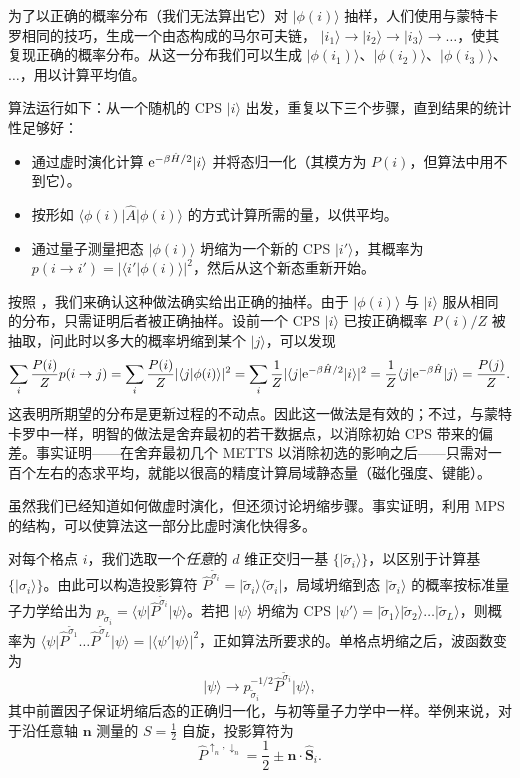 \documentclass[a4paper,10pt,oneside,onecolumn,1p,times]{elsarticle}
\newcommand{\eul}{{\rm e }}
\newcommand{\bra}[1]{\mbox{$\langle #1  |$}}
\newcommand{\ket}[1]{\mbox{$| #1  \rangle$}}
\newcommand{\braket}[2]{\mbox{$\langle #1  | #2 \rangle$}} 	%
\begin{document}
为了以正确的概率分布（我们无法算出它）对 $\ket{\phi(i)}$ 抽样，人们使用与蒙特卡罗相同的技巧，生成一个由态构成的马尔可夫链，
$\ket{i_1} \rightarrow \ket{i_2} \rightarrow \ket{i_3} \rightarrow \ldots$，使其复现正确的概率分布。从这一分布我们可以生成 $\ket{\phi(i_1)}$、$\ket{\phi(i_2)}$、$\ket{\phi(i_3)}$、$\ldots$，用以计算平均值。

算法运行如下：从一个随机的 CPS $\ket{i}$ 出发，重复以下三个步骤，直到结果的统计性足够好：
\begin{itemize}  
\item 通过虚时演化计算 $\eul^{-\beta\hat{H}/2} \ket{i}$ 并将态归一化（其模方为 $P(i)$，但算法中用不到它）。
\item 按形如 $\bra{\phi(i)} \hat{A} \ket{\phi(i)}$ 的方式计算所需的量，以供平均。
\item 通过量子测量把态 $\ket{\phi(i)}$ 坍缩为一个新的 CPS $\ket{i'}$，其概率为 $p(i\rightarrow i') = |\braket{i'}{\phi(i)}|^2$，然后从这个新态重新开始。
\end{itemize}

按照 \cite{Stoudenmire10}，我们来确认这种做法确实给出正确的抽样。由于 $\ket{\phi(i)}$ 与 $\ket{i}$ 服从相同的分布，只需证明后者被正确抽样。设前一个 CPS $\ket{i}$ 已按正确概率 $P(i)/Z$ 被抽取，问此时以多大的概率坍缩到某个 $\ket{j}$，可以发现
\begin{equation}
\sum_i \frac{P(i)}{Z} p(i\rightarrow j) = \sum_i \frac{P(i)}{Z} | \braket{j}{\phi(i)} |^2 = \sum_i
\frac{1}{Z} | \bra{j} \eul^{-\beta \hat{H}/2} \ket{i}|^2 = \frac{1}{Z} \bra{j} \eul^{-\beta\hat{H}} \ket{j} = \frac{P(j)}{Z}.
\end{equation}
这表明所期望的分布是更新过程的不动点。因此这一做法是有效的；不过，与蒙特卡罗中一样，明智的做法是舍弃最初的若干数据点，以消除初始 CPS 带来的偏差。事实证明——在舍弃最初几个 METTS 以消除初选的影响之后——只需对一百个左右的态求平均，就能以很高的精度计算局域静态量（磁化强度、键能）。

虽然我们已经知道如何做虚时演化，但还须讨论坍缩步骤。事实证明，利用 MPS 的结构，可以使算法这一部分比虚时演化快得多。

对每个格点 $i$，我们选取一个{\em 任意}的 $d$ 维正交归一基 $\{ \ket{\tilde{\sigma}_i} \}$，以区别于计算基 $\{ \ket{\sigma_i} \}$。由此可以构造投影算符 $\hat{P}^{\tilde{\sigma}_i} = \ket{\tilde{\sigma}_i} \bra{\tilde{\sigma}_i}$，局域坍缩到态 $\ket{\tilde{\sigma}_i}$ 的概率按标准量子力学给出为
$p_{\tilde{\sigma}_i} =\bra{\psi} \hat{P}^{\tilde{\sigma}_i} \ket{\psi}$。若把 $\ket{\psi}$ 坍缩为 CPS
$\ket{\psi'} = \ket{ \tilde{\sigma}_1} \ket{ \tilde{\sigma}_2} \ldots \ket{ \tilde{\sigma}_L}$，则概率为  $\bra{\psi} \hat{P}^{\tilde{\sigma}_1} \ldots \hat{P}^{\tilde{\sigma}_L} \ket{\psi} = | \braket{\psi'}{\psi} |^2$，正如算法所要求的。单格点坍缩之后，波函数变为
\begin{equation}
\ket{\psi} \rightarrow  p_{\tilde{\sigma}_i}^{-1/2} \hat{P}^{\tilde{\sigma}_i}\ket{\psi} ,
\end{equation}
其中前置因子保证坍缩后态的正确归一化，与初等量子力学中一样。举例来说，对于沿任意轴 ${\mathbf n}$ 测量的 $S=\frac{1}{2}$ 自旋，投影算符为
\begin{equation}
\hat{P}^{\uparrow_n,\downarrow_n} = \frac{1}{2} \pm {\mathbf n} \cdot \hat{{\mathbf S}}_i .
\end{equation}
\end{document}
